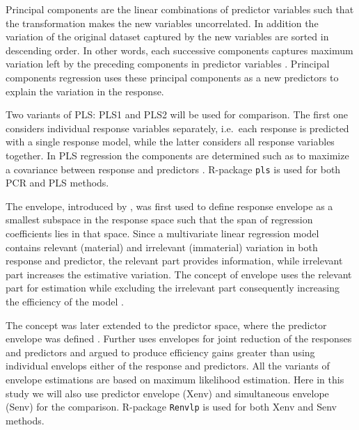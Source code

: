 \documentclass[12pt,3p,authoryear]{elsarticle}
\providecommand{\tightlist}{%
  \setlength{\itemsep}{0pt}\setlength{\parskip}{0pt}}
\begin{document}
\begin{description}
\tightlist
\item[\emph{Principal Components Regression (PCR):}]
Principal components are the linear combinations of predictor variables
such that the transformation makes the new variables uncorrelated. In
addition the variation of the original dataset captured by the new
variables are sorted in descending order. In other words, each
successive components captures maximum variation left by the preceding
components in predictor variables \citep{Jolliffe2002}. Principal
components regression uses these principal components as a new
predictors to explain the variation in the response.
\item[\emph{Partial Least Squares (PLS):}]
Two variants of PLS: PLS1 and PLS2 will be used for comparison. The
first one considers individual response variables separately, i.e.~each
response is predicted with a single response model, while the latter
considers all response variables together. In PLS regression the
components are determined such as to maximize a covariance between
response and predictors \citep{DeJong1993}. R-package \texttt{pls}
\citep{pls2018} is used for both PCR and PLS methods.
\item[\emph{Envelopes:}]
The envelope, introduced by \citet{Cook2007a}, was first used to define
response envelope \citep{cook2010envelope} as a smallest subspace in the
response space such that the span of regression coefficients lies in
that space. Since a multivariate linear regression model contains
relevant (material) and irrelevant (immaterial) variation in both
response and predictor, the relevant part provides information, while
irrelevant part increases the estimative variation. The concept of
envelope uses the relevant part for estimation while excluding the
irrelevant part consequently increasing the efficiency of the model
\citep{cook2016algorithms}.

The concept was later extended to the predictor space, where the
predictor envelope was defined \citep{cook2013envelopes}. Further
\citet{cook2015simultaneous} uses envelopes for joint reduction of the
responses and predictors and argued to produce efficiency gains greater
than using individual envelops either of the response and predictors.
All the variants of envelope estimations are based on maximum likelihood
estimation. Here in this study we will also use predictor envelope
(Xenv) and simultaneous envelope (Senv) for the comparison. R-package
\texttt{Renvlp} \citep{env2018} is used for both Xenv and Senv methods.
\end{description}
\end{document}
